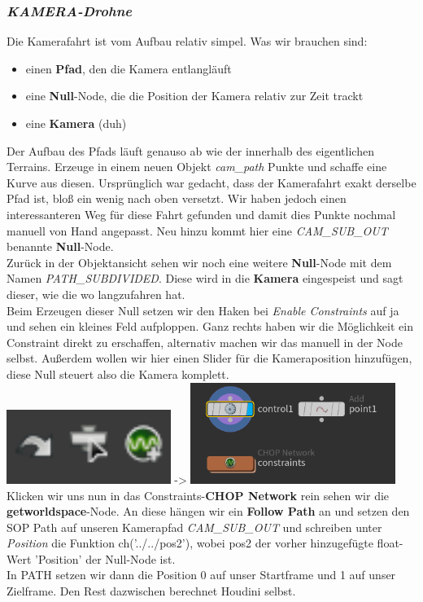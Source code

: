 \documentclass[paper=a4,fontsize=12pt,ngerman]{scrartcl}
\begin{document}
	\subsubsection*{\textit{KAMERA-Drohne}}
	Die Kamerafahrt ist vom Aufbau relativ simpel. Was wir brauchen sind:
	\begin{itemize}
		\item einen \textbf{Pfad}, den die Kamera entlangläuft
		\item eine \textbf{Null}-Node, die die Position der Kamera relativ zur Zeit trackt
		\item eine \textbf{Kamera} (duh)	
	\end{itemize}
	Der Aufbau des Pfads läuft genauso ab wie der innerhalb des eigentlichen Terrains. Erzeuge in einem neuen Objekt \textit{cam\_path} Punkte und schaffe eine Kurve aus diesen. Ursprünglich war gedacht, dass der Kamerafahrt exakt derselbe Pfad ist, bloß ein wenig nach oben versetzt. Wir haben jedoch einen interessanteren Weg für diese Fahrt gefunden und damit dies Punkte nochmal manuell von Hand angepasst. Neu hinzu kommt hier eine \textit{CAM\_SUB\_OUT} benannte \textbf{Null}-Node.\\
	Zurück in der Objektansicht sehen wir noch eine weitere \textbf{Null}-Node mit dem Namen \textit{PATH\_SUBDIVIDED}. Diese wird in die \textbf{Kamera} eingespeist und sagt dieser, wie die wo langzufahren hat.\\
	Beim Erzeugen dieser Null setzen wir den Haken bei \textit{Enable Constraints} auf ja und sehen ein kleines Feld aufploppen. Ganz rechts haben wir die Möglichkeit ein Constraint direkt zu erschaffen, alternativ machen wir das manuell in der Node selbst. Außerdem wollen wir hier einen Slider für die Kameraposition hinzufügen, diese Null steuert also die Kamera komplett.\\
	\includegraphics*[width=0.4\textwidth]{graphics/Nedim_Kamera_Constraints.png}
	->
	\includegraphics*[width=0.5\textwidth]{graphics/Nedim_Kamera_CHOP_Network.png}\\
	Klicken wir uns nun in das Constraints-\textbf{CHOP Network} rein sehen wir die \textbf{getworldspace}-Node. An diese hängen wir ein \textbf{Follow Path} an und setzen den SOP Path auf unseren Kamerapfad \textit{CAM\_SUB\_OUT} und schreiben unter \textit{Position} die Funktion ch('../../pos2'), wobei pos2 der vorher hinzugefügte float-Wert 'Position' der Null-Node ist.\\
	In PATH setzen wir dann die Position 0 auf unser Startframe und 1 auf unser Zielframe. Den Rest dazwischen berechnet Houdini selbst.
	
\end{document}
